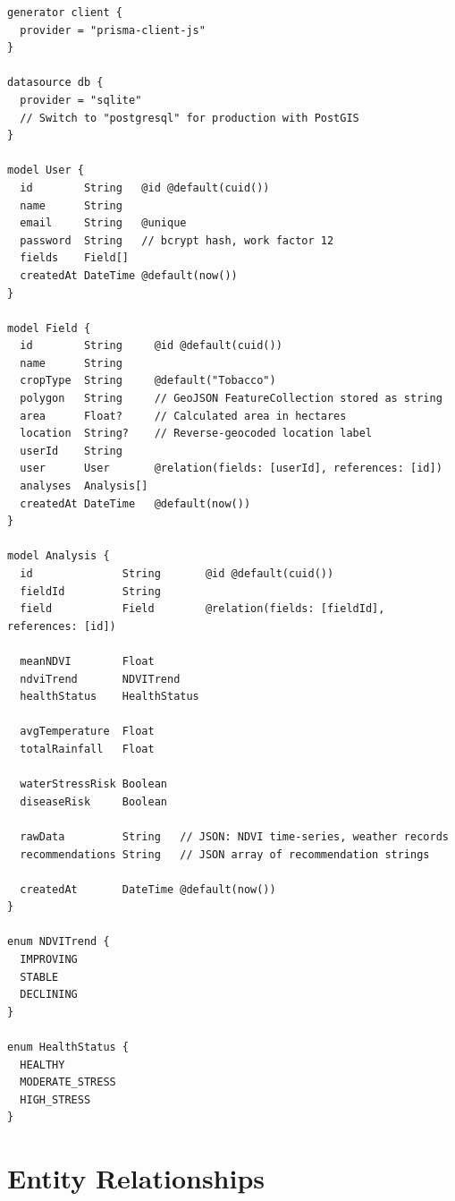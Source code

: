 \documentclass[12pt,a4paper]{report}
\begin{document}
\begin{lstlisting}[caption={schema.prisma -- Database Schema Definition}, label={lst:schema}]
generator client {
  provider = "prisma-client-js"
}

datasource db {
  provider = "sqlite"
  // Switch to "postgresql" for production with PostGIS
}

model User {
  id        String   @id @default(cuid())
  name      String
  email     String   @unique
  password  String   // bcrypt hash, work factor 12
  fields    Field[]
  createdAt DateTime @default(now())
}

model Field {
  id        String     @id @default(cuid())
  name      String
  cropType  String     @default("Tobacco")
  polygon   String     // GeoJSON FeatureCollection stored as string
  area      Float?     // Calculated area in hectares
  location  String?    // Reverse-geocoded location label
  userId    String
  user      User       @relation(fields: [userId], references: [id])
  analyses  Analysis[]
  createdAt DateTime   @default(now())
}

model Analysis {
  id              String       @id @default(cuid())
  fieldId         String
  field           Field        @relation(fields: [fieldId], references: [id])

  meanNDVI        Float
  ndviTrend       NDVITrend
  healthStatus    HealthStatus

  avgTemperature  Float
  totalRainfall   Float

  waterStressRisk Boolean
  diseaseRisk     Boolean

  rawData         String   // JSON: NDVI time-series, weather records
  recommendations String   // JSON array of recommendation strings

  createdAt       DateTime @default(now())
}

enum NDVITrend {
  IMPROVING
  STABLE
  DECLINING
}

enum HealthStatus {
  HEALTHY
  MODERATE_STRESS
  HIGH_STRESS
}
\end{lstlisting}

\section*{Entity Relationships}
\end{document}
